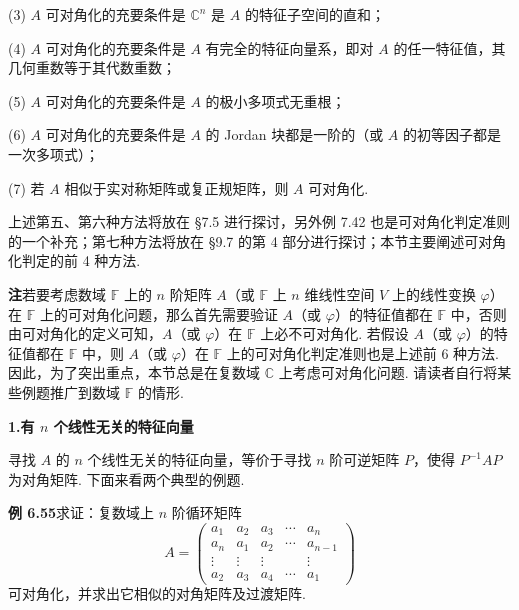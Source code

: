 \documentclass[UTF8, 12pt, fontset=fandol, oneside]{ctexart}
\begin{document}
(3) $A$ 可对角化的充要条件是 $\mathbb{C}^n$ 是 $A$ 的特征子空间的直和；

(4) $A$ 可对角化的充要条件是 $A$ 有完全的特征向量系，即对 $A$ 的任一特征值，其几何重数等于其代数重数；

(5) $A$ 可对角化的充要条件是 $A$ 的极小多项式无重根；

(6) $A$ 可对角化的充要条件是 $A$ 的 Jordan 块都是一阶的（或 $A$ 的初等因子都是一次多项式）；

(7) 若 $A$ 相似于实对称矩阵或复正规矩阵，则 $A$ 可对角化.

上述第五、第六种方法将放在 §7.5 进行探讨，另外例 7.42 也是可对角化判定准则的一个补充；第七种方法将放在 §9.7 的第 4 部分进行探讨；本节主要阐述可对角化判定的前 4 种方法.

\noindent\textbf{注}\quad 若要考虑数域 $\mathbb{F}$ 上的 $n$ 阶矩阵 $A$（或 $\mathbb{F}$ 上 $n$ 维线性空间 $V$ 上的线性变换 $\varphi$）在 $\mathbb{F}$ 上的可对角化问题，那么首先需要验证 $A$（或 $\varphi$）的特征值都在 $\mathbb{F}$ 中，否则由可对角化的定义可知，$A$（或 $\varphi$）在 $\mathbb{F}$ 上必不可对角化. 若假设 $A$（或 $\varphi$）的特征值都在 $\mathbb{F}$ 中，则 $A$（或 $\varphi$）在 $\mathbb{F}$ 上的可对角化判定准则也是上述前 6 种方法. 因此，为了突出重点，本节总是在复数域 $\mathbb{C}$ 上考虑可对角化问题. 请读者自行将某些例题推广到数域 $\mathbb{F}$ 的情形.

\noindent\textbf{1.\quad 有 $n$ 个线性无关的特征向量}

寻找 $A$ 的 $n$ 个线性无关的特征向量，等价于寻找 $n$ 阶可逆矩阵 $P$，使得 $P^{-1}AP$ 为对角矩阵. 下面来看两个典型的例题.

\noindent\textbf{例 6.55}\quad 求证：复数域上 $n$ 阶循环矩阵
\[
A=\left(\begin{array}{ccccc}
a_1 & a_2 & a_3 & \cdots & a_n\\
a_n & a_1 & a_2 & \cdots & a_{n-1}\\
\vdots & \vdots & \vdots & & \vdots\\
a_2 & a_3 & a_4 & \cdots & a_1
\end{array}\right)
\]
可对角化，并求出它相似的对角矩阵及过渡矩阵.
\end{document}
